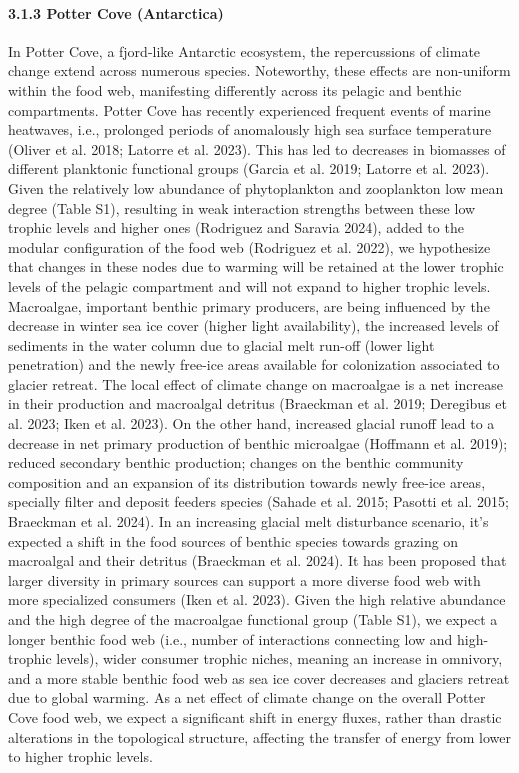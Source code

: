 \documentclass[
]{article}
\begin{document}
\paragraph{3.1.3 Potter Cove
(Antarctica)}\label{potter-cove-antarctica-1}

In Potter Cove, a fjord-like Antarctic ecosystem, the repercussions of
climate change extend across numerous species. Noteworthy, these effects
are non-uniform within the food web, manifesting differently across its
pelagic and benthic compartments. Potter Cove has recently experienced
frequent events of marine heatwaves, i.e., prolonged periods of
anomalously high sea surface temperature (Oliver et al. 2018; Latorre et
al. 2023). This has led to decreases in biomasses of different
planktonic functional groups (Garcia et al. 2019; Latorre et al. 2023).
Given the relatively low abundance of phytoplankton and zooplankton low
mean degree (Table S1), resulting in weak interaction strengths between
these low trophic levels and higher ones (Rodriguez and Saravia 2024),
added to the modular configuration of the food web (Rodriguez et al.
2022), we hypothesize that changes in these nodes due to warming will be
retained at the lower trophic levels of the pelagic compartment and will
not expand to higher trophic levels. Macroalgae, important benthic
primary producers, are being influenced by the decrease in winter sea
ice cover (higher light availability), the increased levels of sediments
in the water column due to glacial melt run-off (lower light
penetration) and the newly free-ice areas available for colonization
associated to glacier retreat. The local effect of climate change on
macroalgae is a net increase in their production and macroalgal detritus
(Braeckman et al. 2019; Deregibus et al. 2023; Iken et al. 2023). On the
other hand, increased glacial runoff lead to a decrease in net primary
production of benthic microalgae (Hoffmann et al. 2019); reduced
secondary benthic production; changes on the benthic community
composition and an expansion of its distribution towards newly free-ice
areas, specially filter and deposit feeders species (Sahade et al. 2015;
Pasotti et al. 2015; Braeckman et al. 2024). In an increasing glacial
melt disturbance scenario, it's expected a shift in the food sources of
benthic species towards grazing on macroalgal and their detritus
(Braeckman et al. 2024). It has been proposed that larger diversity in
primary sources can support a more diverse food web with more
specialized consumers (Iken et al. 2023). Given the high relative
abundance and the high degree of the macroalgae functional group (Table
S1), we expect a longer benthic food web (i.e., number of interactions
connecting low and high-trophic levels), wider consumer trophic niches,
meaning an increase in omnivory, and a more stable benthic food web as
sea ice cover decreases and glaciers retreat due to global warming. As a
net effect of climate change on the overall Potter Cove food web, we
expect a significant shift in energy fluxes, rather than drastic
alterations in the topological structure, affecting the transfer of
energy from lower to higher trophic levels.
\end{document}
